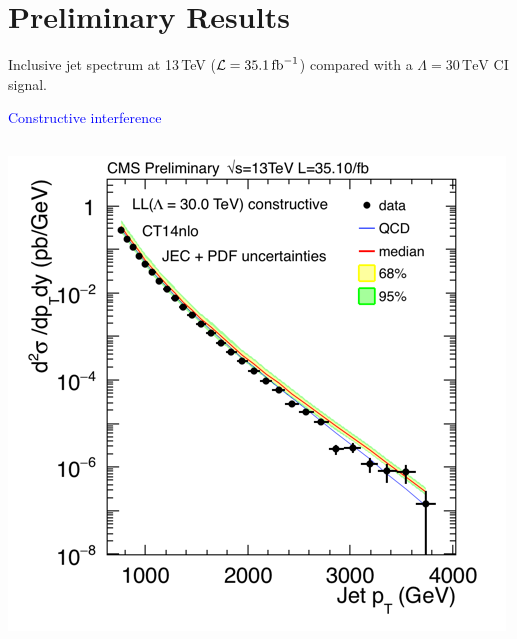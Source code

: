 \documentclass[t,professionalfonts,handout, xcolor=pdftex,dvipsnames,table]{beamer}
\begin{document}
\section{Preliminary Results}
\begin{frame}
Inclusive jet spectrum at 13\,TeV (${\cal L} = 35.1\,\textrm{fb}^{-1}$) compared with a $\Lambda = 30\,\textrm{TeV}$ CI signal.

\medskip

\textcolor{blue}{Constructive interference}

\medskip

\begin{columns}[T]

\begin{column}{0.49\textwidth}
\centerline{\includegraphics[width=\textwidth]{xsection_LL.png}}
\end{column}


\end{columns}
\end{frame}
\end{document}
